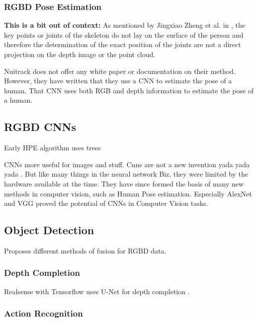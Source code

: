 \subsubsection{RGBD Pose Estimation}

\textbf{This is a bit out of context:}
As mentioned by Jingxiao Zheng et al. in \cite{MultiModalHPERGBD}, the key points or joints of the skeleton do not lay on the surface of the person and therefore the determination of the exact position of the joints are not a direct projection on the depth image or the point cloud.

\cite{PASCUALHERNANDEZ2022102225}

\cite{RGBDHPEforRoboticTaskLearning}

Nuitrack does not offer any white paper or documentation on their method. However, they have written that they use a CNN to estimate the pose of a human. That CNN uses both RGB and depth information to estimate the pose of a human.


\subsection{RGBD CNNs}

Early HPE algorithm uses trees \cite{EarlyRGBDHPE}

CNNs more useful for images and stuff. Cnns are not a new invention yada yada yada \cite{OldCNN}. But like many things in the neural network Biz, they were limited by the hardware available at the time. They have since formed the basis of many new methods in computer vision, such as Human Pose estimation. Especially AlexNet \cite{AlexNet} and VGG \cite{VGG} proved the potential of CNNs in Computer Vision tasks. 

\subsection{Object Detection}

\cite{3DCNNSalient} Proposes different methods of fusion for RGBD data.

\subsubsection{Depth Completion}

Realsense with Tensorflow \cite{TensorflowRealsense} uses U-Net for depth completion \cite{UNET}.

\subsubsection{Action Recognition}

